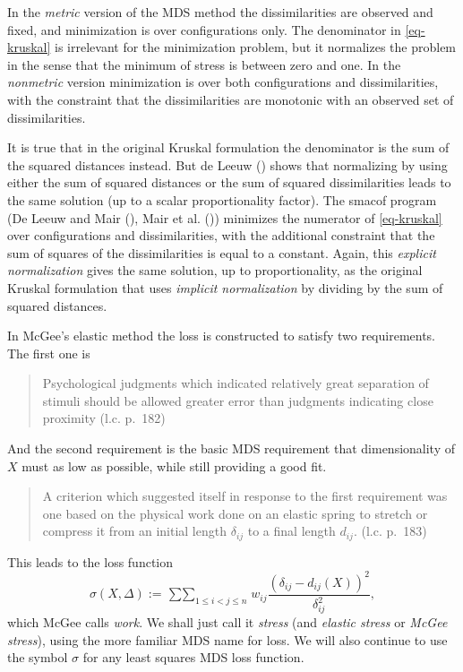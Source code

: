 \documentclass[
  12pt,
  letterpaper,
  DIV=11,
  numbers=noendperiod]{scrartcl}
\begin{document}
In the \emph{metric} version of the MDS method the dissimilarities are
observed and fixed, and minimization is over configurations only. The
denominator in \eqref{eq-kruskal} is irrelevant for the minimization
problem, but it normalizes the problem in the sense that the minimum of
stress is between zero and one. In the \emph{nonmetric} version
minimization is over both configurations and dissimilarities, with the
constraint that the dissimilarities are monotonic with an observed set
of dissimilarities.

It is true that in the original Kruskal formulation the denominator is
the sum of the squared distances instead. But {de Leeuw}
() shows that normalizing by using
either the sum of squared distances or the sum of squared
dissimilarities leads to the same solution (up to a scalar
proportionality factor). The smacof program (De Leeuw and Mair
(), {Mair et al.}
()) minimizes the
numerator of \eqref{eq-kruskal} over configurations and dissimilarities,
with the additional constraint that the sum of squares of the
dissimilarities is equal to a constant. Again, this \emph{explicit
normalization} gives the same solution, up to proportionality, as the
original Kruskal formulation that uses \emph{implicit normalization} by
dividing by the sum of squared distances.

In McGee's elastic method the loss is constructed to satisfy two
requirements. The first one is

\begin{quote}
Psychological judgments which indicated relatively great separation of
stimuli should be allowed greater error than judgments indicating close
proximity (l.c. p.~182)
\end{quote}

And the second requirement is the basic MDS requirement that
dimensionality of \(X\) must as low as possible, while still providing a
good fit.

\begin{quote}
A criterion which suggested itself in response to the first requirement
was one based on the physical work done on an elastic spring to stretch
or compress it from an initial length \(\delta_{ij}\) to a final length
\(d_{ij}\). (l.c. p.~183)
\end{quote}

This leads to the loss function \begin{equation}
  \sigma(X,\Delta) := \mathop{\sum\sum}_{1 \leq i<j \leq n}w_{ij}\frac{(\delta_{ij} - d_{ij}(X))^2}{\delta_{ij}^2},\label{eq-mcgee}
\end{equation} which McGee calls \emph{work}. We shall just call it
\emph{stress} (and \emph{elastic stress} or \emph{McGee stress}), using
the more familiar MDS name for loss. We will also continue to use the
symbol \(\sigma\) for any least squares MDS loss function.
\end{document}
